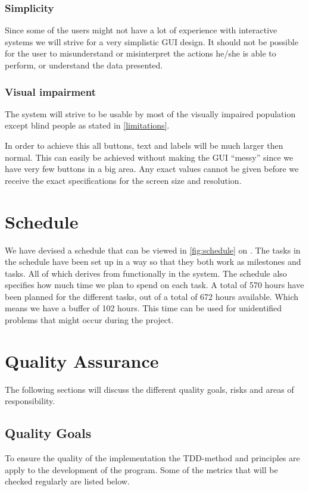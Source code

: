 \documentclass[a4paper,twoside,titlepage]{article}
\begin{document}
		\subsubsection{Simplicity}
			Since some of the users might not have a lot of experience with interactive systems we will strive for a very simplistic GUI design. It should not be possible for the user to misunderstand or misinterpret the actions he/she is able to perform, or understand the data presented.

		\subsubsection{Visual impairment}
			The system will strive to be usable by most of the visually impaired population except blind people as stated in \autoref{limitations}.

			In order to achieve this all buttons, text and labels will be much larger then normal. This can easily be achieved without making the GUI ``messy'' since we have very few buttons in a big area. Any exact values cannot be given before we receive the exact specifications for the screen size and resolution. 

\section{Schedule}
	We have devised a schedule that can be viewed in \autoref{fig:schedule} on \pagename{} \pageref{fig:schedule}.  The tasks in the schedule have been set up in a way so that they both work as milestones and tasks. All of which derives from functionally in the system. The schedule also specifies how much time we plan to spend on each task. A total of 570 hours have been planned for the different tasks, out of a total of 672 hours available. Which means we have a buffer of 102 hours. This time can be used for unidentified problems that might occur during the project.

\section{Quality Assurance}
	The following sections will discuss the different quality goals, risks and areas of responsibility. 
	\subsection{Quality Goals}
		To ensure the quality of the implementation the TDD-method and principles are apply to the development of the program. Some of the metrics that will be checked regularly are listed below.
\end{document}
